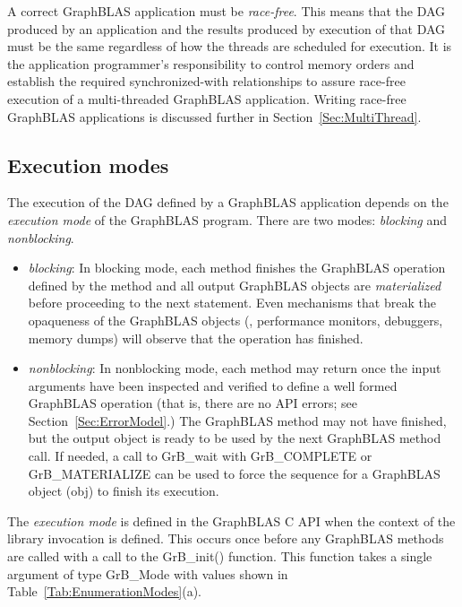 A correct GraphBLAS application must be \emph{race-free}.  This means that the 
DAG produced by an application and the results produced by execution of that 
DAG must be the same regardless of how the threads are scheduled for execution.  
It is the application programmer's 
responsibility to control memory orders and establish the required synchronized-with
relationships to assure race-free execution of a multi-threaded GraphBLAS 
application.  Writing race-free GraphBLAS applications is discussed further in 
Section~\ref{Sec:MultiThread}.

\subsection{Execution modes}
\label{Sec:Modes}

The execution of the DAG defined by a GraphBLAS application depends on the
\emph{execution mode} of the GraphBLAS program.  There are two modes:
\emph{blocking} and \emph{nonblocking}.

\begin{itemize}
\item \emph{blocking}: In blocking mode, each method finishes the
GraphBLAS operation defined by the method and all output GraphBLAS
objects are \emph{materialized} before proceeding to the
next statement.  Even mechanisms that break the opaqueness of the
GraphBLAS objects (\eg, performance monitors, debuggers, memory dumps)
will observe that the operation has finished.

\item \emph{nonblocking}: In nonblocking mode, each method may return
once the input arguments have been inspected and verified to define
a well formed GraphBLAS operation (that is, there are no API errors;
see Section~\ref{Sec:ErrorModel}.) The GraphBLAS method may not have
finished, but the output object is ready to be used by the next GraphBLAS
method call.  If needed, a call to {\sf GrB\_wait} with {\sf GrB\_COMPLETE} or 
{\sf GrB\_MATERIALIZE} can be used to force the sequence for a GraphBLAS 
object ({\sf obj}) to finish its execution.
\end{itemize}

The \emph{execution mode} is defined in the GraphBLAS C API when the context of 
the library invocation is defined.  This occurs once before any GraphBLAS
methods are called with a call to the {\sf GrB\_init()} function.
This function takes a single argument of type {\sf GrB\_Mode} with values
shown in Table~\ref{Tab:EnumerationModes}(a).

